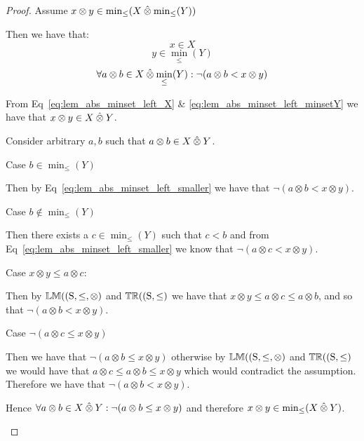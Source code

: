 \documentclass[../Summary.tex]{subfiles}
\begin{document}
\begin{proof}

\vspace{0.5em}
Assume $x \otimes y \in \min_\leq(X \mathbin{\hat{\otimes}} \min_\leq(Y))$

\begin{ind}
Then we have that:
\begin{equation} \label{eq:lem_abs_minset_left_X}
x \in X
\end{equation}
\begin{equation} \label{eq:lem_abs_minset_left_minsetY}
y \in \min_\leq(Y)
\end{equation}
\begin{equation} \label{eq:lem_abs_minset_left_smaller}
\forall a \otimes b \in X \mathbin{\hat{\otimes}} \min_\leq(Y) : \neg (a \otimes b < x \otimes y)
\end{equation}

From Eq~\ref{eq:lem_abs_minset_left_X} \& \ref{eq:lem_abs_minset_left_minsetY} we have that $x \otimes y \in X \mathbin{\hat{\otimes}} Y$.

\vspace{0.5em}

Consider arbitrary $a, b$ such that $a \otimes b \in X \mathbin{\hat{\otimes}} Y$.
\begin{ind}
Case $b \in \min_\leq(Y)$
\begin{ind}
Then by Eq~\ref{eq:lem_abs_minset_left_smaller} we have that $\neg (a \otimes b < x \otimes y)$.
\end{ind}
Case $b \notin \min_\leq(Y)$
\begin{ind}
Then there exists a $c \in \min_\leq(Y)$ such that $c < b$ and from Eq~\ref{eq:lem_abs_minset_left_smaller} we know that $\neg (a \otimes c < x \otimes y)$.

\vspace{0.5em}

Case $x \otimes y \leq a \otimes c$:
\begin{ind}
Then by ${\mathbb{LM}}(\mathrm{(S,\leq,\otimes)}$ and ${\mathbb{TR}}(\mathrm{(S,\leq)}$ we have that $x \otimes y \leq a \otimes c \leq a \otimes b$, and so that $\neg (a \otimes b < x \otimes y)$.
\end{ind}
Case $\neg (a \otimes c \leq x \otimes y)$
\begin{ind}
Then we have that $\neg(a \otimes b \leq x \otimes y)$ otherwise by ${\mathbb{LM}}(\mathrm{(S,\leq,\otimes)}$ and ${\mathbb{TR}}(\mathrm{(S,\leq)}$ we would have that $a \otimes c \leq a \otimes b \leq x \otimes y$ which would contradict the assumption. Therefore we have that $\neg (a \otimes b < x \otimes y)$.
\end{ind}
\end{ind}
\end{ind}
Hence $\forall a \otimes b \in X \mathbin{\hat{\otimes}} Y : \neg (a \otimes b \leq x \otimes y)$ and therefore $x \otimes y \in \min_\leq(X \mathbin{\hat{\otimes}} Y)$.


\end{ind}
\end{proof}
\end{document}

